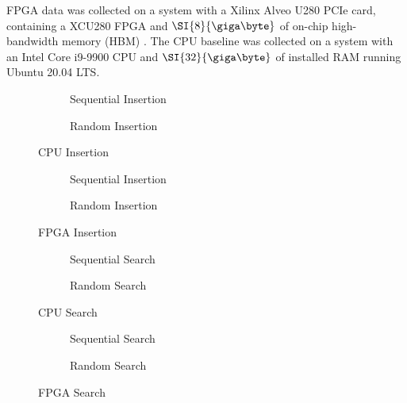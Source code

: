 
FPGA data was collected on a system with a Xilinx Alveo U280 PCIe card,
containing a XCU280 FPGA and $\SI{8}{\giga\byte}$ of on-chip high-bandwidth
memory (HBM) \autocite{u280}. The CPU baseline was collected on a system with an
Intel Core i9-9900 CPU and $\SI{32}{\giga\byte}$ of installed RAM running Ubuntu
20.04 LTS.



\begin{figure}[H]
	\centering
	\begin{subfigure}{7.5cm}
		\centering
		
		\caption{Sequential Insertion}
		\label{fig:cpu-sequential-insertion}
	\end{subfigure}
	\begin{subfigure}{7.5cm}
		\centering
		
		\caption{Random Insertion}
		\label{fig:cpu-random-insertion}
	\end{subfigure}
	\caption{CPU Insertion}
	\label{fig:cpu-insertion}
\end{figure}

\begin{figure}[H]
	\centering
	\begin{subfigure}{7.5cm}
		\centering
		
		\caption{Sequential Insertion}
		\label{fig:fpga-sequential-insertion}
	\end{subfigure}
	\begin{subfigure}{7.5cm}
		\centering
		
		\caption{Random Insertion}
		\label{fig:fpga-random-insertion}
	\end{subfigure}
	\caption{FPGA Insertion}
	\label{fig:fpga-insertion}
\end{figure}

\begin{figure}[H]
	\centering
	\begin{subfigure}{7.5cm}
		\centering
		
		\caption{Sequential Search}
		\label{fig:cpu-sequential-search}
	\end{subfigure}
	\begin{subfigure}{7.5cm}
		\centering
		
		\caption{Random Search}
		\label{fig:cpu-random-search}
	\end{subfigure}
	\caption{CPU Search}
	\label{fig:cpu-search}
\end{figure}

\begin{figure}[H]
	\centering
	\begin{subfigure}{7.5cm}
		\centering
		
		\caption{Sequential Search}
		\label{fig:fpga-sequential-search}
	\end{subfigure}
	\begin{subfigure}{7.5cm}
		\centering
		
		\caption{Random Search}
		\label{fig:fpga-random-search}
	\end{subfigure}
	\caption{FPGA Search}
	\label{fig:fpga-search}
\end{figure}


